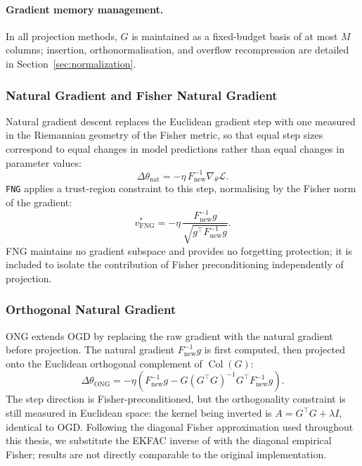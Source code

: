 \paragraph{Gradient memory management.}
In all projection methods, $G$ is maintained as a fixed-budget basis of at most $M$ columns; 
insertion, orthonormalisation, and overflow recompression are detailed in Section~\ref{sec:normalization}.

\subsubsection{Natural Gradient and Fisher Natural Gradient}
Natural gradient descent \citep{amari_natural_1998} replaces the Euclidean
gradient step with one measured in the Riemannian geometry of the Fisher
metric, so that equal step sizes correspond to equal changes in model
predictions rather than equal changes in parameter values:
\begin{equation}
    \Delta\theta_{\mathrm{nat}} = -\eta\,F^{-1}_{\mathrm{new}}\nabla_\theta\mathcal{L}.
\end{equation}
\texttt{FNG} \citep{garg_fisher-orthogonal_2026} applies a trust-region
constraint to this step, normalising by the Fisher norm of the gradient:
\begin{equation}
    v^*_{\mathrm{FNG}}
    = -\eta\,\frac{F^{-1}_{\mathrm{new}} g}
                  {\sqrt{g^\top F^{-1}_{\mathrm{new}} g}}.
\end{equation}
FNG maintains no gradient subspace and provides no forgetting protection;
it is included to isolate the contribution of Fisher preconditioning
independently of projection.

\subsubsection{Orthogonal Natural Gradient}
ONG \citep{yadav_ong_2025} extends OGD by replacing the raw gradient with
the natural gradient before projection.
The natural gradient $F^{-1}_{\mathrm{new}}g$ is first computed, then
projected onto the Euclidean orthogonal complement of $\operatorname{Col}(G)$:
\begin{equation}
    \Delta\theta_{\mathrm{ONG}}
    = -\eta\!\left(
        F_{\mathrm{new}}^{-1}g
        - G(G^\top G)^{-1}G^\top F_{\mathrm{new}}^{-1}g
    \right).
\end{equation}
The step direction is Fisher-preconditioned, but the orthogonality
constraint is still measured in Euclidean space: the kernel being
inverted is $A = G^\top G + \lambda I$, identical to OGD.
Following the diagonal Fisher approximation used throughout this thesis,
we substitute the EKFAC inverse of \citet{yadav_ong_2025} with the
diagonal empirical Fisher; results are not directly comparable to the 
original implementation.

